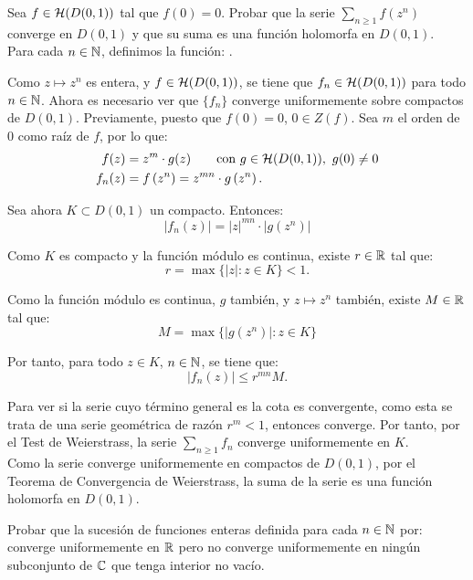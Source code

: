 \begin{ejercicio}
    Sea $f\in \mathcal{H}(D(0,1))$ tal que $f(0)=0$. Probar que la serie $\sum\limits_{n\geq 1} f\left(z^n\right)$ converge en $D(0,1)$ y que su suma es una función holomorfa en $D(0,1)$.\\

    Para cada $n\in\mathbb{N}$, definimos la función:
    .

    Como $z\mapsto z^n$ es entera, y $f\in \mathcal{H}(D(0,1))$, se tiene que $f_n\in \mathcal{H}(D(0,1))$ para todo $n\in\mathbb{N}$. Ahora es necesario ver que $\{f_n\}$ converge uniformemente sobre compactos de $D(0,1)$. Previamente, puesto que $f(0)=0$, $0\in Z(f)$. Sea $m$ el orden de $0$ como raíz de $f$, por lo que:
    \begin{align*}
        f(z) &= z^m\cdot g(z)\qquad \text{con } g\in \mathcal{H}(D(0,1)),\ g(0)\neq 0\\
        f_n(z) &= f\left(z^n\right) = z^{mn}\cdot g\left(z^n\right).
    \end{align*}

    Sea ahora $K\subset D(0,1)$ un compacto. Entonces:
    \begin{equation*}
        \left|f_n(z)\right| = |z|^{mn}\cdot |g(z^n)|
    \end{equation*}

    Como $K$ es compacto y la función módulo es continua, existe $r\in\mathbb{R}$ tal que:
    \[
    r = \max\{|z| : z\in K\} < 1.
    \]

    Como la función módulo es continua, $g$ también, y $z \mapsto z^n$ también, existe $M\in\mathbb{R}$ tal que:
    \[
    M = \max\{|g(z^n)| : z\in K\}
    \]

    Por tanto, para todo $z\in K$, $n\in\mathbb{N}$, se tiene que:
    \[
    \left|f_n(z)\right| \leq r^{mn} M.
    \]

    Para ver si la serie cuyo término general es la cota es convergente, como esta se trata de una serie geométrica de razón $r^m<1$, entonces converge. Por tanto, por el Test de Weierstrass, la serie $\sum\limits_{n\geq 1} f_n$ converge uniformemente en $K$.\\

    Como la serie converge uniformemente en compactos de $D(0,1)$, por el Teorema de Convergencia de Weierstrass, la suma de la serie es una función holomorfa en $D(0,1)$.
\end{ejercicio}

\begin{ejercicio}
    Probar que la sucesión de funciones enteras definida para cada $n\in\mathbb{N}$ por:
    converge uniformemente en $\mathbb{R}$ pero no converge uniformemente en ningún subconjunto de $\mathbb{C}$ que tenga interior no vacío.
\end{ejercicio}

